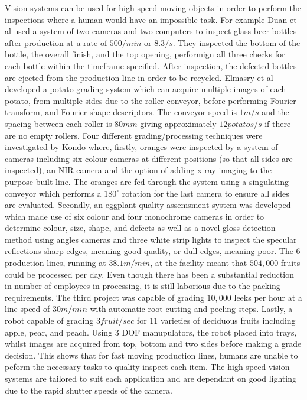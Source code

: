 \documentclass[fleqn,twoside]{article}
\begin{document}
Vision systems can be used for high-speed moving objects in order to perform the inspections where a human would have an impossible task. For example Duan et al \cite{duan} used a system of two cameras and two computers to inspect glass beer bottles after production at a rate of $500/min$ or $8.3/s$. They inspected the bottom of the bottle, the overall finish, and the top opening, performign all three checks for each bottle within the timeframe specified. After inspection, the defected bottles are ejected from the production line in order to be recycled. Elmasry et al \cite{elmasry1} developed a potato grading system which can acquire multiple images of each potato, from multiple sides due to the roller-conveyor, before performing Fourier transform, and Fourier shape descriptors. The conveyor speed is $1m/s$ and the spacing between each roller is $80mm$ giving approximately $12 potatos/s$ if there are no empty rollers. Four different grading/processing techniques were investigated by Kondo \cite{kondo} where, firstly, oranges were inspected by a system of cameras including six colour cameras at different positions (so that all sides are inspected), an NIR camera and the option of adding x-ray imaging to the purpose-built line. The oranges are fed through the system using a singulating conveyor which performs a $180^{\circ}$ rotation for the last camera to ensure all sides are evaluated. Secondly, an eggplant quality assemsment system was developed which made use of six colour and four monochrome cameras in order to determine colour, size, shape, and defects as well as a novel gloss detection method using angles cameras and three white strip lights to inspect the specular reflections sharp edges, meaning good quality, or dull edges, meaning poor. The 6 production lines, running at $38.1m/min$, at the facility meant that $504,000$ fruits could be processed per day. Even though there has been a substantial reduction in number of employees in processing, it is still laborious due to the packing requirements. The third project was capable of grading $10,000$ leeks per hour at a line speed of $30m/min$ with automatic root cutting and peeling steps. Lastly, a robot capable of grading $3 fruit/sec$ for 11 varieties of deciduous fruits including apple, pear, and peach. Using 3 DOF manupulators, the robot placed into trays, whilst images are acquired from top, bottom and two sides before making a grade decision. This shows that for fast moving production lines, humans are unable to peform the necessary tasks to quality inspect each item. The high speed vision systems are tailored to suit each application and are dependant on good lighting due to the rapid shutter speeds of the camera.
\end{document}
